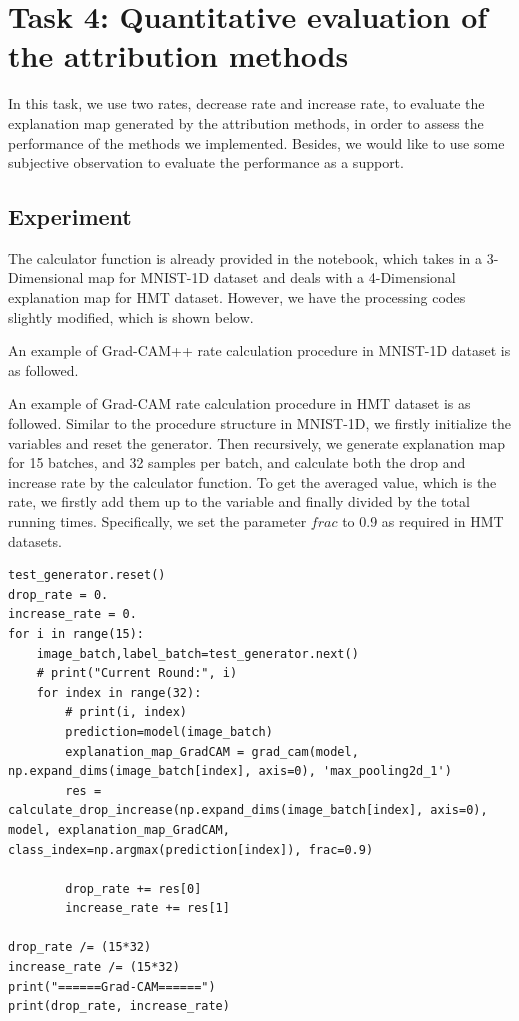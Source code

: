 \documentclass[conference]{IEEEtran}
\begin{document}

\section{Task 4: Quantitative evaluation of the attribution methods}

In this task, we use two rates, decrease rate and increase rate, to evaluate the explanation map generated by the attribution methods, in order to assess the performance of the methods we implemented. Besides, we would like to use some subjective observation to evaluate the performance as a support.

\subsection {Experiment}

The calculator function is already provided in the notebook, which takes in a 3-Dimensional map for MNIST-1D dataset and deals with a 4-Dimensional explanation map for HMT dataset. However, we have the processing codes slightly modified, which is shown below.

An example of Grad-CAM++ rate calculation procedure in MNIST-1D dataset is as followed.


An example of Grad-CAM rate calculation procedure in HMT dataset is as followed. Similar to the procedure structure in MNIST-1D, we firstly initialize the variables and reset the generator. Then recursively, we generate explanation map for 15 batches, and 32 samples per batch, and calculate both the drop and increase rate by the calculator function. To get the averaged value, which is the rate, we firstly add them up to the variable and finally divided by the total running times. Specifically, we set the parameter $frac$ to 0.9 as required in HMT datasets.

\begin{lstlisting}
test_generator.reset()
drop_rate = 0.
increase_rate = 0.
for i in range(15):
    image_batch,label_batch=test_generator.next()
    # print("Current Round:", i)
    for index in range(32):
        # print(i, index)
        prediction=model(image_batch)
        explanation_map_GradCAM = grad_cam(model, np.expand_dims(image_batch[index], axis=0), 'max_pooling2d_1')
        res = calculate_drop_increase(np.expand_dims(image_batch[index], axis=0), model, explanation_map_GradCAM, class_index=np.argmax(prediction[index]), frac=0.9)

        drop_rate += res[0]
        increase_rate += res[1]

drop_rate /= (15*32)
increase_rate /= (15*32)
print("======Grad-CAM======")
print(drop_rate, increase_rate)
\end{lstlisting}
\end{document}
